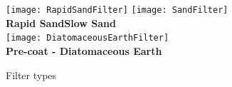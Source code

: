 \begin{itemize}
\begin{figure}[H]
\begin{center}
\texttt{[image: RapidSandFilter]} \hspace{0.7 cm}\texttt{[image: SandFilter]}\hspace{0.7 cm}\\
\textbf{Rapid Sand}\hspace{5 cm}\textbf{Slow Sand}\\
\vspace{0.8cm}
\texttt{[image: DiatomaceousEarthFilter]}\\
\textbf{Pre-coat - Diatomaceous Earth}\\
\caption{Filter types}
\end{center}
\end{figure}


\end{itemize}
